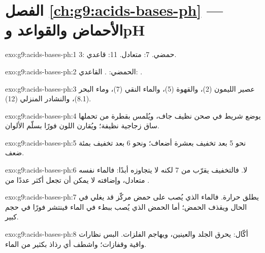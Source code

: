 \section*{الفصل \ref{ch:g9:acids-bases-ph} --- الأحماض والقواعد وpH}

\begin{solution}{exo:g9:acids-bases-ph:1}
 3: حمضي.  7: متعادل.  11: قاعدي.
\end{solution}

\begin{solution}{exo:g9:acids-bases-ph:2}
الحمضي:  . القاعدي:  .
\end{solution}

\begin{solution}{exo:g9:acids-bases-ph:3}
عصير الليمون (2)، والقهوة (5)، والماء النقي (7)، وماء البحر (8.1)، والنشادر
المنزلي (12).
\end{solution}

\begin{solution}{exo:g9:acids-bases-ph:4}
يوضع شريط في صحن نظيف جاف، ويُلمس بقطرة من  تحملها ساق زجاجية
نظيفة؛ ويُقارن اللون فورًا بسلّم
الألوان.
\end{solution}

\begin{solution}{exo:g9:acids-bases-ph:5}
نحو 5 بعد تخفيف بعشرة أضعاف؛ ونحو 6 بعد تخفيف بمئة ضعف.
\end{solution}

\begin{solution}{exo:g9:acids-bases-ph:6}
لا. فالتخفيف يقرّب  من 7 لكنه لا يتجاوزه أبدًا: فالماء نفسه متعادل،
وإضافته لا يمكن أن تجعل   أكثر عددًا من  .
\end{solution}

\begin{solution}{exo:g9:acids-bases-ph:7}
 يطلق حرارة. فالماء الذي يُصب على حمض مركّز قد يغلي في الحال ويقذف
الحمض؛ أما الحمض الذي يُصب ببطء في الماء فينتشر فورًا في حجم
كبير.
\end{solution}

\begin{solution}{exo:g9:acids-bases-ph:8}
أكّال: يحرق الجلد والعينين، ويهاجم الفلزات. البس نظارات واقية وقفازات؛
واشطف أي رذاذ بكثير من الماء.
\end{solution}

